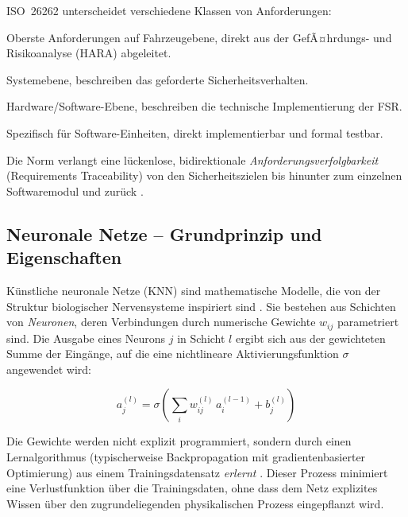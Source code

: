 ﻿\documentclass[12pt,a4paper]{article}
\begin{document}
ISO~26262 unterscheidet verschiedene Klassen von Anforderungen:

\begin{description}[leftmargin=2cm, style=nextline]
  \item[Sicherheitsziele (Safety Goals):] Oberste Anforderungen auf Fahrzeugebene,
    direkt aus der GefÃ¤hrdungs- und Risikoanalyse (HARA) abgeleitet.
  \item[Funktionale Sicherheitsanforderungen (FSR):] Systemebene, beschreiben das
    geforderte Sicherheitsverhalten.
  \item[Technische Sicherheitsanforderungen (TSR):] Hardware/Software-Ebene,
    beschreiben die technische Implementierung der FSR.
  \item[Software-Sicherheitsanforderungen (SSR):] Spezifisch f\"ur Software-Einheiten,
    direkt implementierbar und formal testbar.
\end{description}

Die Norm verlangt eine l\"uckenlose, bidirektionale
\emph{Anforderungsverfolgbarkeit} (Requirements Traceability) von den Sicherheitszielen
bis hinunter zum einzelnen Softwaremodul und zur\"uck \cite{iso26262_6}.

\subsection{Neuronale Netze -- Grundprinzip und Eigenschaften}
\label{subsec:knn_grundlagen}

K\"unstliche neuronale Netze (KNN) sind mathematische Modelle, die von der Struktur
biologischer Nervensysteme inspiriert sind \cite{Rumelhart1986}. Sie bestehen aus
Schichten von \emph{Neuronen}, deren Verbindungen durch numerische Gewichte
$w_{ij}$ parametriert sind. Die Ausgabe eines Neurons $j$ in Schicht $l$ ergibt sich
aus der gewichteten Summe der Eing\"ange, auf die eine nichtlineare
Aktivierungsfunktion $\sigma$ angewendet wird:

\begin{equation}
  a_j^{(l)} = \sigma\!\left(\sum_{i} w_{ij}^{(l)}\, a_i^{(l-1)} + b_j^{(l)}\right)
  \label{eq:neuron}
\end{equation}

Die Gewichte werden nicht explizit programmiert, sondern durch einen Lernalgorithmus
(typischerweise Backpropagation mit gradientenbasierter Optimierung) aus einem
Trainingsdatensatz \emph{erlernt} \cite{Goodfellow2016}. Dieser Prozess minimiert
eine Verlustfunktion \"uber die Trainingsdaten, ohne dass dem Netz explizites Wissen
\"uber den zugrundeliegenden physikalischen Prozess eingepflanzt wird.
\end{document}
